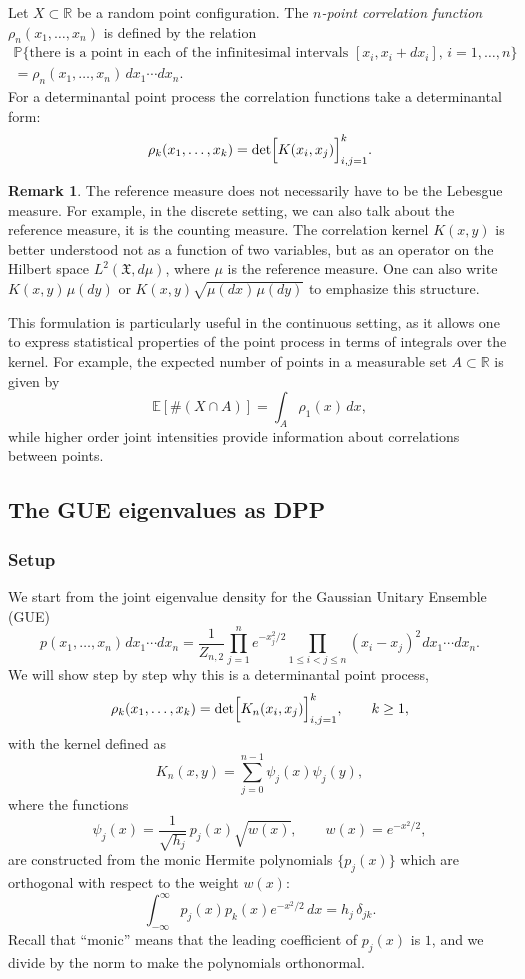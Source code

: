 \documentclass[letterpaper,11pt,oneside,reqno]{book}
\numberwithin{equation}{chapter}  %
\newcommand{\ssp}{\hspace{1pt}}
\theoremstyle{definition}
\newtheorem{remark}[proposition]{Remark}
\begin{document}
Let $X\subset \mathbb{R}$ be a random point configuration. The \emph{$n$-point correlation function} $\rho_n(x_1,\dots,x_n)$ is defined by the relation
\begin{multline*}
\mathbb{P}\{\text{there is a point in each of the infinitesimal intervals } [x_i, x_i+dx_i], \, i=1,\dots,n\}
\\
=\rho_n(x_1,\dots,x_n)\,dx_1\cdots dx_n.
\end{multline*}
For a determinantal point process the correlation functions take a determinantal form:
\[
\rho_k(x_1,\dots,x_k)=\det\Bigl[K(x_i,x_j)\Bigr]_{i,j=1}^k.
\]
\begin{remark}
	The reference measure does not necessarily have to be the Lebesgue measure.
	For example, in the discrete setting, we can also talk about the
	reference measure, it is the counting measure.
	The correlation kernel $K(x,y)$ is better understood not as a function of two variables, but as an operator on the Hilbert space
	$L^2(\mathfrak{X},d\mu)$, where $\mu$ is the reference measure.
	One can also write $K(x,y)\ssp\mu(dy)$ or $K(x,y)\sqrt{\mu(dx)\ssp \mu(dy)}$ to emphasize this structure.
\end{remark}

This formulation is particularly useful in the continuous setting, as it allows one to express statistical properties of the point process in terms of integrals over the kernel. For example, the expected number of points in a measurable set $A\subset \mathbb{R}$ is given by
\[
\mathbb{E}[\#(X\cap A)]=\int_A \rho_1(x)\,dx,
\]
while higher order joint intensities provide information about correlations between points.

\subsection{The GUE eigenvalues as DPP}

\subsubsection{Setup}

We start from the joint eigenvalue density for the Gaussian Unitary Ensemble (GUE)
\begin{equation}
\label{lecture5:eq:gue-joint-density}
p(x_1,\dots,x_n)
\ssp dx_1\cdots dx_n
=\frac{1}{Z_{n,2}}\prod_{j=1}^n e^{-x_j^2/2}\prod_{1\le i<j\le n} (x_i-x_j)^2
\ssp dx_1\cdots dx_n.
\end{equation}
We will show step by step why this is a determinantal point process,
\[
	\rho_k(x_1,\dots,x_k)=\det\Bigl[K_n(x_i,x_j)\Bigr]_{i,j=1}^k, \qquad k\ge1,
\]
with the kernel defined as
\[
K_n(x,y)=\sum_{j=0}^{n-1}\psi_j(x)\psi_j(y),
\]
where the functions
\[
\psi_j(x)=\frac{1}{\sqrt{h_j}}\,p_j(x)\sqrt{w(x)},\qquad w(x)=e^{-x^2/2},
\]
are constructed from the monic Hermite polynomials $\{p_j(x)\}$ which are orthogonal with respect to the weight $w(x)$:
\[
\int_{-\infty}^\infty p_j(x)p_k(x)e^{-x^2/2}\,dx = h_j\,\delta_{jk}.
\]
Recall that ``monic'' means that the leading coefficient of $p_j(x)$ is $1$,
and we divide by the norm to make the polynomials orthonormal.
\end{document}
